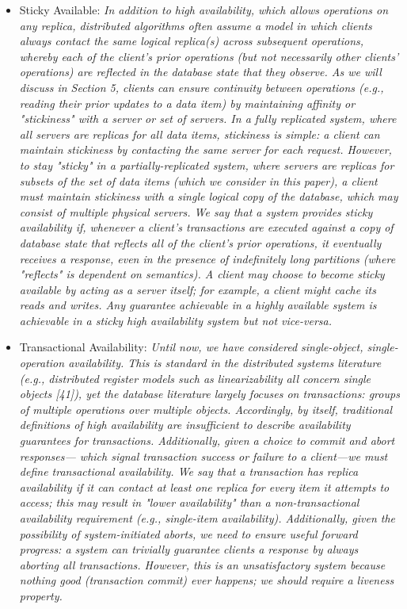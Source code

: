 \documentclass[a4paper,10pt,titlepage]{report}
\begin{document}
\begin{itemize}
        \item Sticky Available: \textit{In addition to high availability, which allows operations on any replica, distributed algorithms often assume a model in which clients always contact the same logical replica(s) across subsequent operations, whereby each of the client's prior operations (but not necessarily other clients' operations) are reflected in the database state that they observe. As we will discuss in Section 5, clients can ensure continuity between operations (e.g., reading their prior updates to a data item) by maintaining affinity or "stickiness" with a server or set of servers. In a fully replicated system, where all servers are replicas for all data items, stickiness is simple: a client can maintain stickiness by contacting the same server for each request. However, to stay "sticky" in a partially-replicated system,    where servers are replicas for subsets of the set of data items (which we consider in this paper), a client must maintain stickiness with a single logical copy of the database, which may consist of multiple physical servers. We say that a system provides sticky availability if, whenever a client's transactions are executed against a copy of database state that reflects all of the client's prior operations, it eventually receives a response, even in the presence of indefinitely long partitions (where "reflects" is dependent on semantics). A client may choose to become sticky available by acting as a server itself; for example, a client might cache its reads and writes. Any guarantee achievable in a highly available system is achievable in a sticky high availability system but not vice-versa.}\cite{HighlyAvailableTransactionsVirtuesandLimitations}
        \item Transactional Availability: \textit{Until now, we have considered single-object, single-operation availability. This is standard in the distributed systems literature    (e.g., distributed register models such as linearizability all concern single objects [41]), yet the database literature largely focuses on transactions: groups of multiple operations over multiple objects. Accordingly, by itself, traditional definitions of high availability are insufficient to describe availability guarantees for transactions. Additionally, given a choice to commit and abort responses— which signal transaction success or failure to a client—we must define transactional availability. We say that a transaction has replica availability if it can contact at least one replica for every item it attempts to access; this may result in "lower availability" than a non-transactional availability requirement (e.g., single-item availability). Additionally, given the possibility of system-initiated aborts, we need to ensure useful forward progress: a system can trivially guarantee clients a response by always aborting all transactions. However, this is an unsatisfactory system because nothing good (transaction commit) ever happens; we should require a liveness property.
}
\end{itemize}
\end{document}
